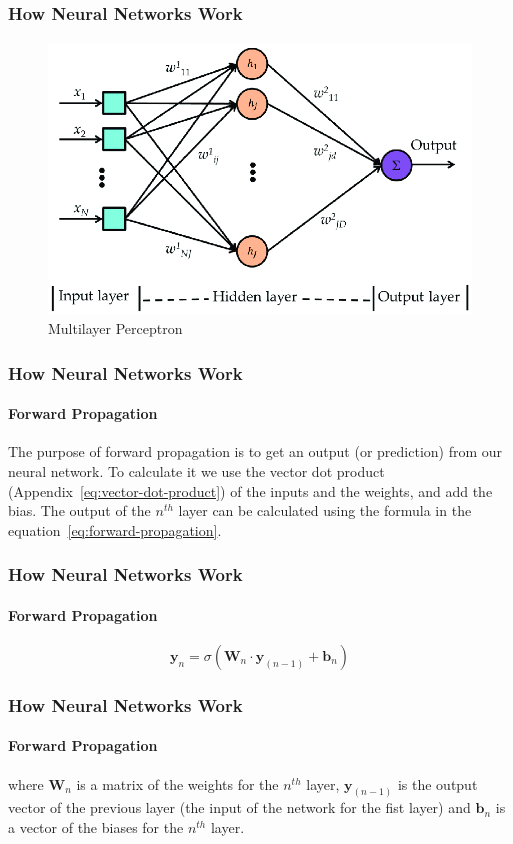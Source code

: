 \documentclass{beamer}
\begin{document}
\begin{frame}
\frametitle{How Neural Networks Work}
\framesubtitle{}
\begin{figure}[h!]
    \includegraphics[width=\textwidth]{assets/multilayer perceptron.png}
    \caption{Multilayer Perceptron}
    \label{fig:multilayer-perceptron}
\end{figure}
\end{frame}

\begin{frame}
\frametitle{How Neural Networks Work}
\framesubtitle{Forward Propagation}
The purpose of forward propagation is to get an output (or prediction) from our neural network. To calculate it we use the vector dot product (Appendix~\ref{eq:vector-dot-product}) of the inputs and the weights, and add the bias. The output of the $n^{th}$ layer can be calculated using the formula in the equation~\ref{eq:forward-propagation}.
\end{frame}

\begin{frame}
\frametitle{How Neural Networks Work}
\framesubtitle{Forward Propagation}
\begin{equation}
    \textbf{y}_n = \sigma{(\textbf{W}_n\cdot\textbf{y}_{(n-1)} + \textbf{b}_n)}
    \label{eq:forward-propagation}
\end{equation}
\end{frame}

\begin{frame}
\frametitle{How Neural Networks Work}
\framesubtitle{Forward Propagation}
where $\textbf{W}_n$ is a matrix of the weights for the $n^{th}$ layer, $\textbf{y}_{(n-1)}$ is the output vector of the previous layer (the input of the network for the fist layer) and $\textbf{b}_n$ is a vector of the biases for the $n^{th}$ layer.
\end{frame}
\end{document}
